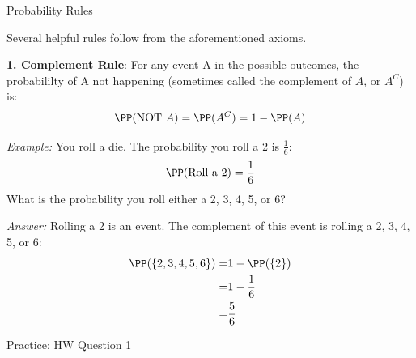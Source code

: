 \begin{frame}{Probability Rules}

Several helpful rules follow from the aforementioned axioms.

\vspace{2ex}
\textbf{1. Complement Rule}: For any event A in the possible outcomes, the probabililty of A not happening (sometimes called the complement of $A$, or $A^C$) is:
\begin{equation*}
    \PP (\text{NOT } A) = \PP (A^C) = 1 - \PP(A)
\end{equation*}

\pause
\vspace{1ex}
\emph{Example: } You roll a die. The probability you roll a 2 is $\frac{1}{6}$:
\begin{equation*}
    \PP (\text{Roll a } 2) = \frac{1}{6}
\end{equation*}
What is the probability you roll either a 2, 3, 4, 5, or 6?

\pause
\emph{Answer: } Rolling a 2 is an event. The complement of this event is rolling a 2, 3, 4, 5, or 6:
\begin{align*}
    \PP (\{2, 3, 4, 5, 6\}) =& 1 - \PP (\{2\}) \\
    =& 1 - \frac{1}{6} \\
    =&\frac{5}{6}
\end{align*}

\vspace{1ex}
Practice: HW Question 1



\end{frame}


